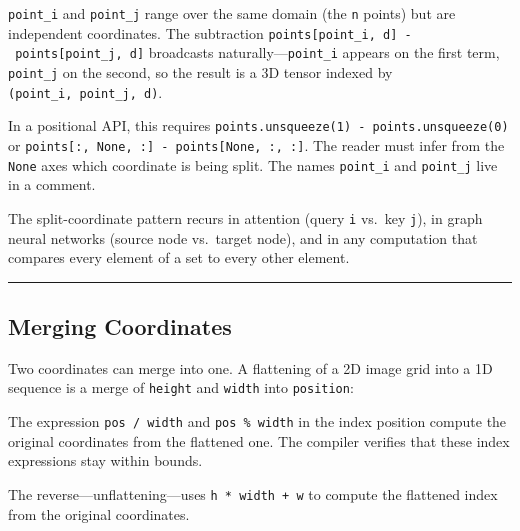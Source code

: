 \documentclass[11pt,]{article}
\newenvironment{Shaded}{}{}
\newcommand{\KeywordTok}[1]{\textcolor[rgb]{0.00,0.44,0.13}{\textbf{#1}}}
\newcommand{\NormalTok}[1]{#1}
\newcommand{\OperatorTok}[1]{\textcolor[rgb]{0.40,0.40,0.40}{#1}}
\begin{document}
\texttt{point\_i} and \texttt{point\_j} range over the same domain (the
\texttt{n} points) but are independent coordinates. The subtraction
\texttt{points{[}point\_i,\ d{]}\ -\ points{[}point\_j,\ d{]}}
broadcasts naturally---\texttt{point\_i} appears on the first term,
\texttt{point\_j} on the second, so the result is a 3D tensor indexed by
\texttt{(point\_i,\ point\_j,\ d)}.

In a positional API, this requires
\texttt{points.unsqueeze(1)\ -\ points.unsqueeze(0)} or
\texttt{points{[}:,\ None,\ :{]}\ -\ points{[}None,\ :,\ :{]}}. The
reader must infer from the \texttt{None} axes which coordinate is being
split. The names \texttt{point\_i} and \texttt{point\_j} live in a
comment.

The split-coordinate pattern recurs in attention (query \texttt{i}
vs.~key \texttt{j}), in graph neural networks (source node vs.~target
node), and in any computation that compares every element of a set to
every other element.

\begin{center}\rule{0.5\linewidth}{0.4pt}\end{center}

\hypertarget{merging-coordinates}{%
\subsection{Merging Coordinates}\label{merging-coordinates}}

Two coordinates can merge into one. A flattening of a 2D image grid into
a 1D sequence is a merge of \texttt{height} and \texttt{width} into
\texttt{position}:

\begin{Shaded}
\end{Shaded}

The expression \texttt{pos\ /\ width} and \texttt{pos\ \%\ width} in the
index position compute the original coordinates from the flattened one.
The compiler verifies that these index expressions stay within bounds.

The reverse---unflattening---uses \texttt{h\ *\ width\ +\ w} to compute
the flattened index from the original coordinates.
\end{document}
